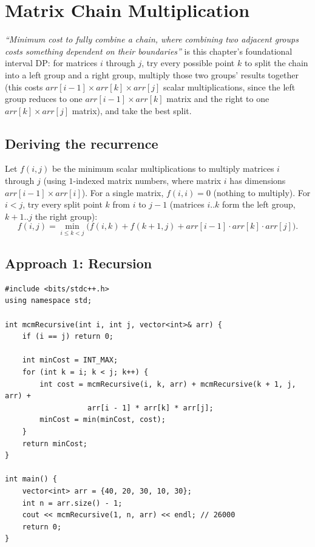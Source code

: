 \section{Matrix Chain Multiplication}
\label{sec:dp-mcm}


\begin{patternbox}
\emph{``Minimum cost to fully combine a chain, where combining two
adjacent groups costs something dependent on their boundaries''} is
this chapter's foundational interval DP: for matrices $i$ through $j$,
try every possible point $k$ to split the chain into a left group and
a right group, multiply those two groups' results together (this
costs $\textit{arr}[i-1] \times \textit{arr}[k] \times \textit{arr}[j]$
scalar multiplications, since the left group reduces to one
$\textit{arr}[i-1]\times\textit{arr}[k]$ matrix and the right to one
$\textit{arr}[k]\times\textit{arr}[j]$ matrix), and take the best
split.
\end{patternbox}

\subsection*{Deriving the recurrence}

Let $f(i,j)$ be the minimum scalar multiplications to multiply matrices
$i$ through $j$ (using $1$-indexed matrix numbers, where matrix $i$ has
dimensions $\textit{arr}[i-1] \times \textit{arr}[i]$). For a single
matrix, $f(i,i)=0$ (nothing to multiply). For $i<j$, try every split
point $k$ from $i$ to $j-1$ (matrices $i..k$ form the left group,
$k{+}1..j$ the right group):
\[
  f(i,j) = \min_{i \le k < j} \Big( f(i,k) + f(k{+}1,j) +
  \textit{arr}[i{-}1] \cdot \textit{arr}[k] \cdot \textit{arr}[j] \Big).
\]

\subsection*{Approach 1: Recursion}

\begin{lstlisting}
#include <bits/stdc++.h>
using namespace std;

int mcmRecursive(int i, int j, vector<int>& arr) {
    if (i == j) return 0;

    int minCost = INT_MAX;
    for (int k = i; k < j; k++) {
        int cost = mcmRecursive(i, k, arr) + mcmRecursive(k + 1, j, arr) +
                   arr[i - 1] * arr[k] * arr[j];
        minCost = min(minCost, cost);
    }
    return minCost;
}

int main() {
    vector<int> arr = {40, 20, 30, 10, 30};
    int n = arr.size() - 1;
    cout << mcmRecursive(1, n, arr) << endl; // 26000
    return 0;
}
\end{lstlisting}

